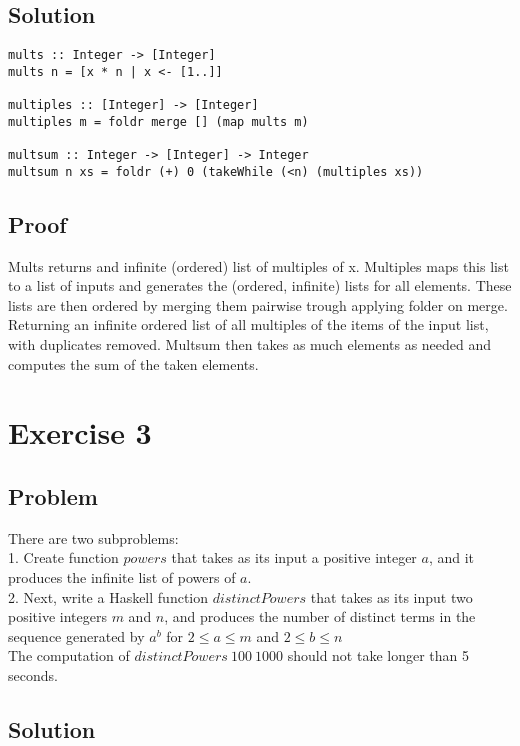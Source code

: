 \documentclass[a4paper,11pt]{article}
\begin{document}
\subsection{Solution}

\begin{lstlisting}
mults :: Integer -> [Integer]
mults n = [x * n | x <- [1..]]

multiples :: [Integer] -> [Integer]
multiples m = foldr merge [] (map mults m)

multsum :: Integer -> [Integer] -> Integer
multsum n xs = foldr (+) 0 (takeWhile (<n) (multiples xs))
\end{lstlisting}

\subsection{Proof}

Mults returns and infinite (ordered) list of multiples of x. Multiples maps this list to a list of inputs and generates the (ordered, infinite) lists for all elements. These lists are then ordered by merging them pairwise trough applying folder on merge. Returning an infinite ordered list of all multiples of the items of the input list, with duplicates removed. Multsum then takes as much elements as needed and computes the sum of the taken elements.

\section{Exercise 3}
\subsection{Problem}
There are two subproblems:\\
1. Create function $powers$ that takes as its input a positive integer $a$, and it produces the infinite
list of powers of $a$.\\
2. Next, write a Haskell function $distinctPowers$ that takes as its input two positive integers $m$ and
$n$, and produces the number of distinct terms in the sequence generated by $a^b$ for $2 \leq a \leq m$ and $2 \leq b \leq n$\\
The computation of $distinctPowers\: 100\: 1000$ should not take longer than 5 seconds.
\subsection{Solution}
\end{document}
